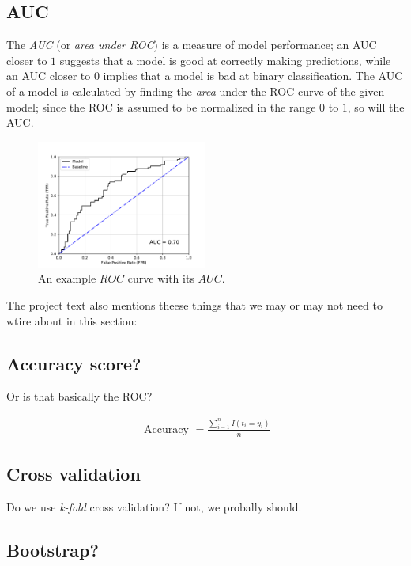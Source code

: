 \documentclass[a4paper,10pt,english]{article}
\begin{document}
\begin{multicols*}{2}
\subsection*{AUC}

The \textit{AUC} (or \textit{area under ROC}) is a measure of model performance; an AUC closer to $1$ suggests that a model is good at correctly making predictions, while an AUC closer to $0$ implies that a model is bad at binary classification.  The AUC of a model is calculated by finding the \textit{area} under the ROC curve of the given model; since the ROC is assumed to be normalized in the range $0$ to $1$, so will the AUC.

\begin{figure}[H]
	\centering
	\includegraphics[width = 0.5\textwidth, center]{roc_sample.pdf}
	\caption{An example $ROC$ curve with its $AUC$.\label{fig_roc_sample}}
\end{figure}


The project text also mentions theese things that we may or may not need to wtire about in this section:

\subsection*{Accuracy score?}

Or is that basically the ROC?

\begin{align*}
\text { Accuracy }=\frac{\sum_{i=1}^{n} I\left(t_{i}=y_{i}\right)}{n}
\end{align*}


\subsection*{Cross validation}

Do we use \textit{k-fold} cross validation? If not, we probally should.


\subsection*{Bootstrap?}


\end{multicols*}
\end{document}
